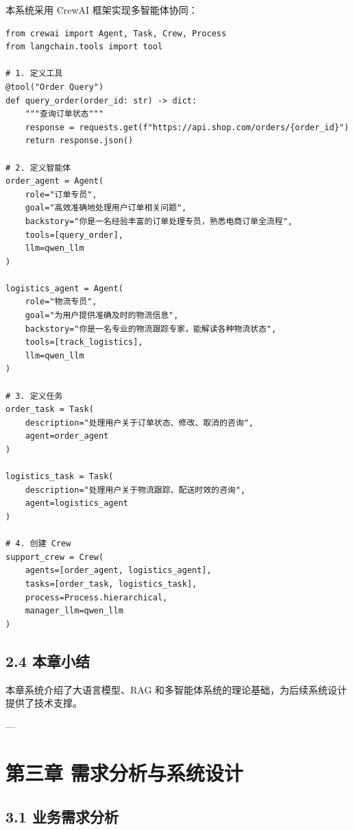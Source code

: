 \documentclass{harryopo-report}
\begin{document}
本系统采用 CrewAI 框架实现多智能体协同：

\begin{lstlisting}[style=pystyle,caption={}]
from crewai import Agent, Task, Crew, Process
from langchain.tools import tool

# 1. 定义工具
@tool("Order Query")
def query_order(order_id: str) -> dict:
    """查询订单状态"""
    response = requests.get(f"https://api.shop.com/orders/{order_id}")
    return response.json()

# 2. 定义智能体
order_agent = Agent(
    role="订单专员",
    goal="高效准确地处理用户订单相关问题",
    backstory="你是一名经验丰富的订单处理专员，熟悉电商订单全流程",
    tools=[query_order],
    llm=qwen_llm
)

logistics_agent = Agent(
    role="物流专员",
    goal="为用户提供准确及时的物流信息",
    backstory="你是一名专业的物流跟踪专家，能解读各种物流状态",
    tools=[track_logistics],
    llm=qwen_llm
)

# 3. 定义任务
order_task = Task(
    description="处理用户关于订单状态、修改、取消的咨询",
    agent=order_agent
)

logistics_task = Task(
    description="处理用户关于物流跟踪、配送时效的咨询",
    agent=logistics_agent
)

# 4. 创建 Crew
support_crew = Crew(
    agents=[order_agent, logistics_agent],
    tasks=[order_task, logistics_task],
    process=Process.hierarchical,
    manager_llm=qwen_llm
)
\end{lstlisting}

\section*{2.4 本章小结}

本章系统介绍了大语言模型、RAG 和多智能体系统的理论基础，为后续系统设计提供了技术支撑。

---

\chapter*{第三章 需求分析与系统设计}

\section*{3.1 业务需求分析}
\end{document}
